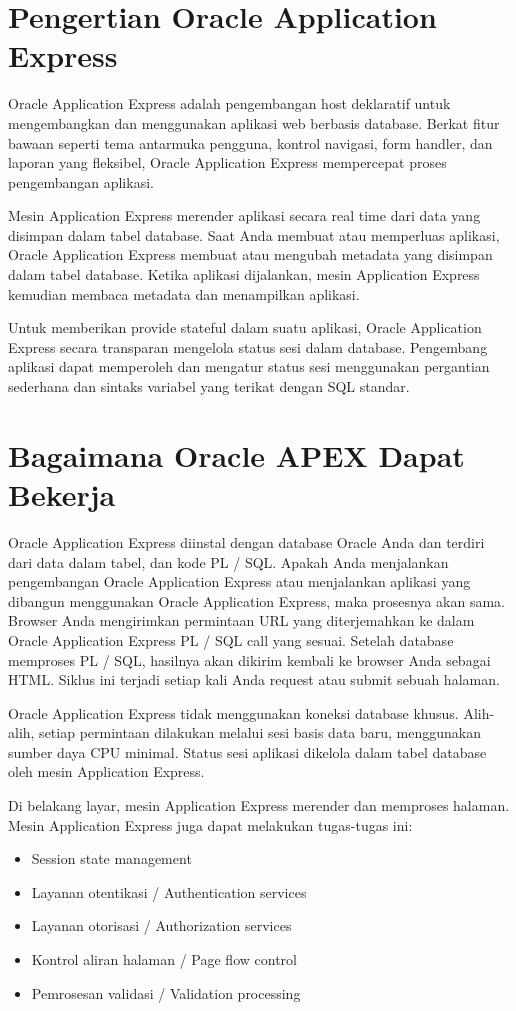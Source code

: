 \section{Pengertian Oracle Application Express}
Oracle Application Express adalah pengembangan host deklaratif untuk mengembangkan dan menggunakan aplikasi web berbasis database. Berkat fitur bawaan seperti tema antarmuka pengguna, kontrol navigasi, form handler, dan laporan yang fleksibel, Oracle Application Express mempercepat proses pengembangan aplikasi.

Mesin Application Express merender aplikasi secara real time dari data yang disimpan dalam tabel database. Saat Anda membuat atau memperluas aplikasi, Oracle Application Express membuat atau mengubah metadata yang disimpan dalam tabel database. Ketika aplikasi dijalankan, mesin Application Express kemudian membaca metadata dan menampilkan aplikasi.

Untuk memberikan provide stateful dalam suatu aplikasi, Oracle Application Express secara transparan mengelola status sesi dalam database. Pengembang aplikasi dapat memperoleh dan mengatur status sesi menggunakan pergantian sederhana dan sintaks variabel yang terikat dengan SQL standar.

\section{Bagaimana Oracle APEX Dapat Bekerja}
Oracle Application Express diinstal dengan database Oracle Anda dan terdiri dari data dalam tabel, dan kode PL / SQL. Apakah Anda menjalankan pengembangan Oracle Application Express atau menjalankan aplikasi yang dibangun menggunakan Oracle Application Express, maka prosesnya akan sama. Browser Anda mengirimkan permintaan URL yang diterjemahkan ke dalam Oracle Application Express PL / SQL call yang sesuai. Setelah database memproses PL / SQL, hasilnya akan dikirim kembali ke browser Anda sebagai HTML. Siklus ini terjadi setiap kali Anda request atau submit sebuah halaman.

\par Oracle Application Express tidak menggunakan koneksi database khusus. Alih-alih, setiap permintaan dilakukan melalui sesi basis data baru, menggunakan sumber daya CPU minimal. Status sesi aplikasi dikelola dalam tabel database oleh mesin Application Express.

\par Di belakang layar, mesin Application Express merender dan memproses halaman. Mesin Application Express juga dapat melakukan tugas-tugas ini:
\begin{itemize}
    \item Session state management
    \item Layanan otentikasi / Authentication services
    \item Layanan otorisasi / Authorization services
    \item Kontrol aliran halaman / Page flow control
    \item Pemrosesan validasi / Validation processing
\end{itemize}

